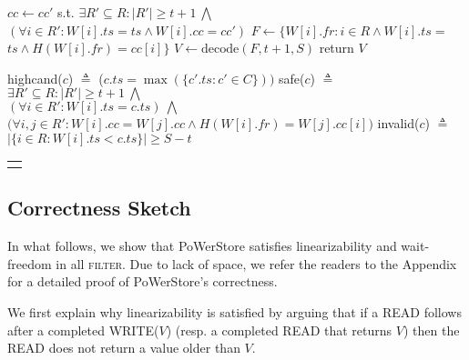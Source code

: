 \documentclass[10pt,conference,compsocconf]{IEEEtran}
\newcommand{\protocol}{PoWerStore}
\begin{document}
\begin{algo}[t]
\begin{distribalgo}[1]
\medskip
{}
\STATE $cc \leftarrow cc'$ s.t. $\exists R' \subseteq R : |R'| \geq t+1\ \bigwedge$\\ $(\forall i \in R' : W[i].ts = ts \wedge W[i].cc = cc')$ \label{alg:reader:cc}
\STATE $F \leftarrow \{W[i].fr : i $$\in$$ R \wedge W[i].ts $$=$$ ts \wedge H(W[i].fr) $$=$$ cc[i]\}$ \label{alg:reader:fr}
\STATE $V \leftarrow \mathrm{decode}(F, t+1, S)$ \label{alg:reader:decode}
\STATE return $V$
\ENDINDENT

\medskip
{}
\STATE \textsf{highcand}($c$) $\triangleq$ ($c.ts = \max(\{c'.ts : c' \in C\}))$
\smallskip
\STATE \textsf{safe}($c$) $\triangleq$ $\exists R' \subseteq R: |R'| \geq t+1 \ \bigwedge$\\ \label{alg:reader:safe}
$(\forall i \in R': W[i].ts = c.ts)\ \bigwedge$\\
$(\forall i,j \in R'$$:$$W[i].cc $$=$$ W[j].cc \wedge H(W[i].fr) $$=$$ W[j].cc[i])$
\smallskip
\STATE \textsf{invalid}($c$) $\triangleq$ $|\{i \in R: W[i].ts < c.ts \}| \geq S-t$
\ENDINDENT

\setcounter{alg:client1:lines}{\value{ALC@line}}
\end{distribalgo}
\begin{tabular}{c}\hline\mbox{}\hspace{0.45\textwidth}\mbox{}\end{tabular}
\caption{{Algorithm of client $r$ in \protocol.}}\label{alg:reader}
\end{algo}

\subsection{Correctness Sketch} \label{sec:pow-sketch}

In what follows, we show that \protocol{} satisfies linearizability and wait-freedom in all \textsc{filter}. Due to lack of space, we refer the readers to the Appendix for a detailed proof of \protocol's correctness.



We first explain why linearizability is satisfied by arguing that if a \textsc{READ} follows after a completed \textsc{WRITE}($V$) (resp. a completed \textsc{READ} that returns $V$) then the \textsc{READ} does not return a value older than $V$.
\end{document}
